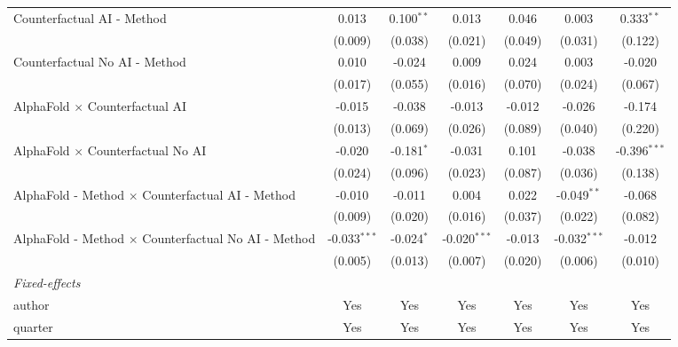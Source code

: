 \begin{tabular}{lcccccc}
   Counterfactual AI - Method                                 & 0.013          & 0.100$^{**}$ & 0.013          & 0.046   & 0.003          & 0.333$^{**}$\\   
                                                              & (0.009)        & (0.038)      & (0.021)        & (0.049) & (0.031)        & (0.122)\\   
   Counterfactual No AI - Method                              & 0.010          & -0.024       & 0.009          & 0.024   & 0.003          & -0.020\\   
                                                              & (0.017)        & (0.055)      & (0.016)        & (0.070) & (0.024)        & (0.067)\\   
   AlphaFold $\times$ Counterfactual AI                       & -0.015         & -0.038       & -0.013         & -0.012  & -0.026         & -0.174\\   
                                                              & (0.013)        & (0.069)      & (0.026)        & (0.089) & (0.040)        & (0.220)\\   
   AlphaFold $\times$ Counterfactual No AI                    & -0.020         & -0.181$^{*}$ & -0.031         & 0.101   & -0.038         & -0.396$^{***}$\\   
                                                              & (0.024)        & (0.096)      & (0.023)        & (0.087) & (0.036)        & (0.138)\\   
   AlphaFold - Method $\times$ Counterfactual AI - Method     & -0.010         & -0.011       & 0.004          & 0.022   & -0.049$^{**}$  & -0.068\\   
                                                              & (0.009)        & (0.020)      & (0.016)        & (0.037) & (0.022)        & (0.082)\\   
   AlphaFold - Method $\times$ Counterfactual No AI - Method  & -0.033$^{***}$ & -0.024$^{*}$ & -0.020$^{***}$ & -0.013  & -0.032$^{***}$ & -0.012\\   
                                                              & (0.005)        & (0.013)      & (0.007)        & (0.020) & (0.006)        & (0.010)\\   
   \midrule
   \emph{Fixed-effects}\\
   author                                                     & Yes            & Yes          & Yes            & Yes     & Yes            & Yes\\  
   quarter                                                    & Yes            & Yes          & Yes            & Yes     & Yes            & Yes\\  

\end{tabular}
